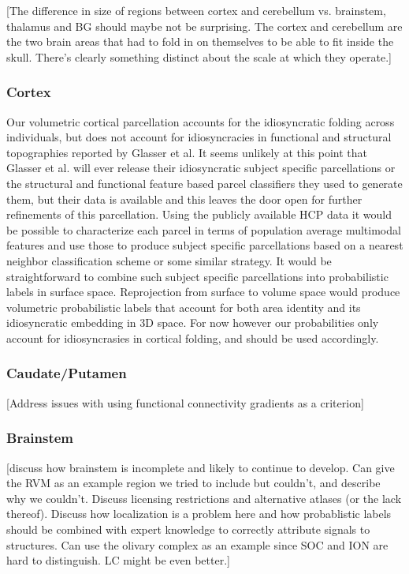 \documentclass[10pt,letterpaper]{article}
\begin{document}
[The difference in size of regions between cortex and cerebellum vs. brainstem, thalamus and BG should maybe not be surprising. The cortex and cerebellum are the two brain areas that had to fold in on themselves to be able to fit inside the skull. There's clearly something distinct about the scale at which they operate.]

\subsubsection{Cortex} Our volumetric cortical parcellation accounts for the idiosyncratic folding across individuals, but does not account for idiosyncracies in functional and structural topographies reported by Glasser et al. It seems unlikely at this point that Glasser et al. will ever release their idiosyncratic subject specific parcellations or the structural and functional feature based parcel classifiers they used to generate them, but their data is available and this leaves the door open for further refinements of this parcellation. Using the publicly available HCP data it would be possible to characterize each parcel in terms of population average multimodal features and use those to produce subject specific parcellations based on a nearest neighbor classification scheme or some similar strategy. It would be straightforward to combine such subject specific parcellations into probabilistic labels in surface space. Reprojection from surface to volume space would produce volumetric probabilistic labels that account for both area identity and its idiosyncratic embedding in 3D space. For now however our probabilities only account for idiosyncrasies in cortical folding, and should be used accordingly.

\subsubsection{Caudate/Putamen} [Address issues with using functional connectivity gradients as a criterion]

\subsubsection{Brainstem} [discuss how brainstem is incomplete and likely to continue to develop. Can give the RVM as an example region we tried to include but couldn't, and describe why we couldn't. Discuss licensing restrictions and alternative atlases (or the lack thereof). Discuss how localization is a problem here and how probablistic labels should be combined with expert knowledge to correctly attribute signals to structures. Can use the olivary complex as an example since SOC and ION are hard to distinguish. LC might be even better.]
\end{document}
